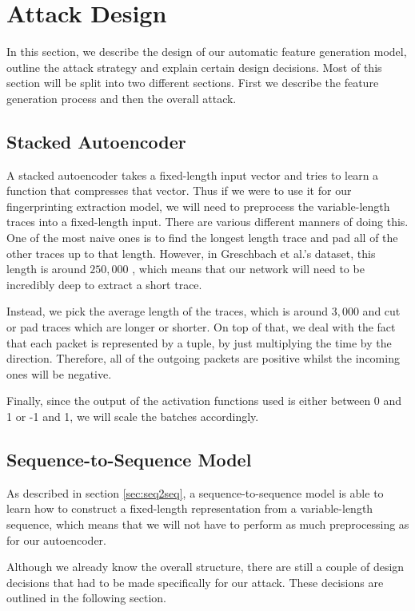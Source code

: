 \chapter{Attack Design}

In this section, we describe the design of our automatic feature generation model, outline the attack strategy and explain certain design decisions.
Most of this section will be split into two different sections.
First we describe the feature generation process and then the overall attack.

\section{Stacked Autoencoder}

A stacked autoencoder takes a fixed-length input vector and tries to learn a function that compresses that vector.
Thus if we were to use it for our fingerprinting extraction model, we will need to preprocess the variable-length traces into a fixed-length input.
There are various different manners of doing this.
One of the most naive ones is to find the longest length trace and pad all of the other traces up to that length.
However, in Greschbach et al.'s dataset, this length is around $250,000$ \cite{greschbach2016effect}, which means that our network will need to be incredibly deep to extract a short trace.

Instead, we pick the average length of the traces, which is around $3,000$ and cut or pad traces which are longer or shorter.
On top of that, we deal with the fact that each packet is represented by a tuple, by just multiplying the time by the direction.
Therefore, all of the outgoing packets are positive whilst the incoming ones will be negative.

Finally, since the output of the activation functions used is either between 0 and 1 or -1 and 1, we will scale the batches accordingly.

\section{Sequence-to-Sequence Model}

As described in section \ref{sec:seq2seq}, a sequence-to-sequence model is able to learn how to construct a fixed-length representation from a variable-length sequence, which means that we will not have to perform as much preprocessing as for our autoencoder.

Although we already know the overall structure, there are still a couple of design decisions that had to be made specifically for our attack.
These decisions are outlined in the following section.

